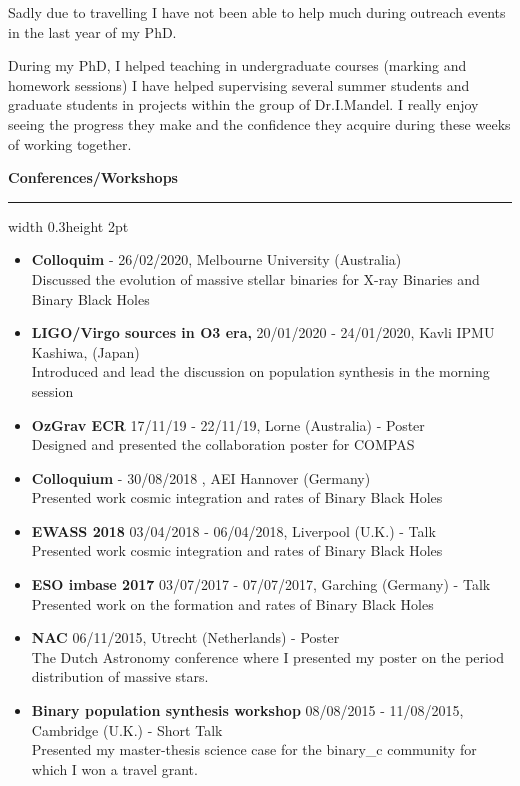 \documentclass[]{res} %
\begin{document}
Sadly due to travelling I have not been able to help much during outreach events in the last year of my PhD.

During my PhD, I helped teaching in undergraduate courses (marking and homework sessions)
I have helped supervising several summer students and graduate students in projects within the
group of Dr.I.Mandel. I really enjoy seeing the progress they make and the confidence they acquire
during these weeks of working together.

\vspace*{20pt}

{\large{\textbf{Conferences/Workshops}}}
{\color{lightgray}\hrule width 0.3\textwidth height 2pt}
\vspace*{7pt}
\begin{itemize}
  \item \textbf{Colloquim} - 26/02/2020, Melbourne University (Australia)\\
    Discussed the evolution of massive stellar binaries for X-ray Binaries and Binary Black Holes
  \item \textbf{LIGO/Virgo sources in O3 era,} 20/01/2020 - 24/01/2020, Kavli IPMU Kashiwa, (Japan)\\
    Introduced and lead the discussion on population synthesis in the morning session
  \item \textbf{OzGrav ECR} 17/11/19 - 22/11/19, Lorne (Australia) - Poster\\
    Designed and presented the collaboration poster for COMPAS
  \item \textbf{Colloquium} - 30/08/2018 , AEI Hannover (Germany) \\
	Presented work cosmic integration and rates of Binary Black Holes 
  \item \textbf{EWASS 2018} 03/04/2018 - 06/04/2018, Liverpool (U.K.) - Talk \\
 	Presented work cosmic integration and rates of Binary Black Holes 	
  \item \textbf{ESO imbase 2017} 03/07/2017 - 07/07/2017, Garching (Germany) - Talk\\
 	Presented work on the formation and rates of Binary Black Holes
  \item \textbf{NAC} 06/11/2015, Utrecht (Netherlands) - Poster\\
 	The Dutch Astronomy conference where I presented my poster on the period distribution of massive stars.
  \item \textbf{Binary population synthesis workshop} 08/08/2015 - 11/08/2015, Cambridge (U.K.) - Short Talk\\
 	Presented my master-thesis science case for the binary\_c community for which I won a travel grant. 	

\end{itemize}
\end{document}
